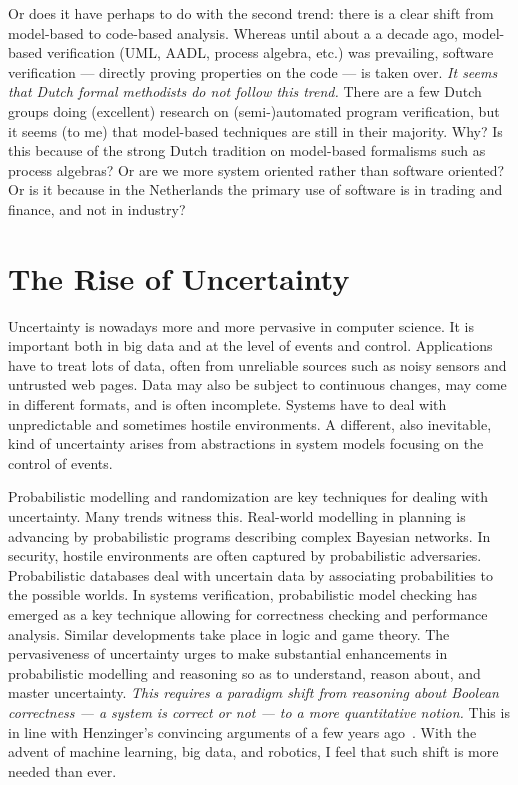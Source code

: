 \documentclass[sigplan,10pt]{acmart}\settopmatter{printfolios=true,printccs=false,printacmref=false}
\begin{document}
Or does it have perhaps to do with the second trend: there is a clear shift from model-based to code-based analysis.
Whereas until about a a decade ago, model-based verification (UML, AADL, process algebra, etc.) was prevailing, software verification --- directly proving properties on the code --- is taken over.
\emph{It seems that Dutch formal methodists do not follow this trend.}
There are a few Dutch groups doing (excellent) research on (semi-)automated program verification, but it seems (to me) that model-based techniques are still in their majority.
Why? Is this because of the strong Dutch tradition on model-based formalisms such as process algebras? 
Or are we more system oriented rather than software oriented? 
Or is it because in the Netherlands the primary use of software is in trading and finance, and not in industry? 

\section{The Rise of Uncertainty}

Uncertainty is nowadays more and more pervasive in computer science. 
It is important both in big data and at the level of events and control. 
Applications have to treat lots of data, often from unreliable sources such as noisy sensors and untrusted web pages. 
Data may also be subject to continuous changes, may come in different formats, and is often incomplete.
Systems have to deal with unpredictable and sometimes hostile environments. 
A different, also inevitable, kind of uncertainty arises from abstractions in system models focusing on the
control of events.

Probabilistic modelling and randomization are key techniques for dealing with uncertainty.
Many trends witness this. 
Real-world modelling in planning is advancing by probabilistic programs describing complex Bayesian networks. 
In security, hostile environments are often captured by probabilistic adversaries. 
Probabilistic databases deal with uncertain data by associating probabilities to the possible worlds. In systems verification, probabilistic model checking has emerged as a key technique allowing for correctness checking and performance analysis. 
Similar developments take place in logic and game theory.
The pervasiveness of uncertainty urges to make substantial enhancements in probabilistic modelling and reasoning so as to understand, reason about, and master uncertainty.
\emph{This requires a paradigm shift from reasoning about Boolean correctness --- a system is correct or not --- to a more quantitative notion.}
This is in line with Henzinger's convincing arguments of a few years ago~\cite{DBLP:journals/ife/Henzinger13}.
With the advent of machine learning, big data, and robotics, I feel that such shift is more needed than ever.
\end{document}
